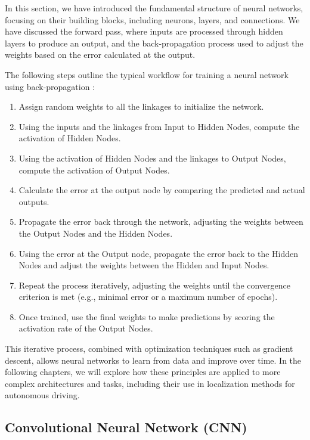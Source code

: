 In this section, we have introduced the fundamental structure of neural networks, focusing on their building blocks, including neurons, layers, and connections. We have discussed the forward pass, where inputs are processed through hidden layers to produce an output, and the back-propagation process used to adjust the weights based on the error calculated at the output.

The following steps outline the typical workflow for training a neural network using back-propagation \cite{10.11648/j.ajnna.20190501.12}:

\begin{enumerate} 
    \item Assign random weights to all the linkages to initialize the network. 
    \item Using the inputs and the linkages from Input to Hidden Nodes, compute the activation of Hidden Nodes. 
    \item Using the activation of Hidden Nodes and the linkages to Output Nodes, compute the activation of Output Nodes. 
    \item Calculate the error at the output node by comparing the predicted and actual outputs. 
    \item Propagate the error back through the network, adjusting the weights between the Output Nodes and the Hidden Nodes. 
    \item Using the error at the Output node, propagate the error back to the Hidden Nodes and adjust the weights between the Hidden and Input Nodes. 
    \item Repeat the process iteratively, adjusting the weights until the convergence criterion is met (e.g., minimal error or a maximum number of epochs). 
    \item Once trained, use the final weights to make predictions by scoring the activation rate of the Output Nodes. 
\end{enumerate}

This iterative process, combined with optimization techniques such as gradient descent, allows neural networks to learn from data and improve over time. In the following chapters, we will explore how these principles are applied to more complex architectures and tasks, including their use in localization methods for autonomous driving.

\subsection{Convolutional Neural Network (CNN)}


